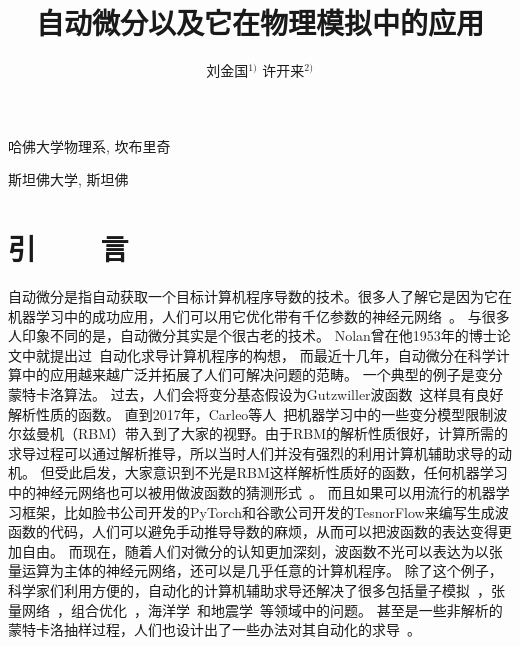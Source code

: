 \documentclass[A4,twoside,fontset=ubuntu,UTF8]{ctexart}
\begin{document}
\apsname

\title{自动微分以及它在物理模拟中的应用\fivestar}%

\author{刘金国$^{1)}$ \quad 许开来$^{2)}$}

\address{1)}{哈佛大学物理系, 坎布里奇 }
\address{2)}{斯坦佛大学, 斯坦佛 }





\cfund{}




{}\baselineskip
\section{引~~~~言}
    自动微分是指自动获取一个目标计算机程序导数的技术。很多人了解它是因为它在机器学习中的成功应用，人们可以用它优化带有千亿参数的神经元网络~\cite{Rosset2019}。
与很多人印象不同的是，自动微分其实是个很古老的技术。
Nolan曾在他1953年的博士论文中就提出过~\cite{Nolan1953}自动化求导计算机程序的构想，
而最近十几年，自动微分在科学计算中的应用越来越广泛并拓展了人们可解决问题的范畴。
    一个典型的例子是变分蒙特卡洛算法。
过去，人们会将变分基态假设为Gutzwiller波函数~\cite{Gutzwiller1963}这样具有良好解析性质的函数。
直到2017年，Carleo等人~\cite{Carleo2017, Deng2017}把机器学习中的一些变分模型限制波尔兹曼机（RBM）带入到了大家的视野。由于RBM的解析性质很好，计算所需的求导过程可以通过解析推导，所以当时人们并没有强烈的利用计算机辅助求导的动机。
但受此启发，大家意识到不光是RBM这样解析性质好的函数，任何机器学习中的神经元网络也可以被用做波函数的猜测形式~\cite{Cai2018}。
而且如果可以用流行的机器学习框架，比如脸书公司开发的PyTorch和谷歌公司开发的TesnorFlow来编写生成波函数的代码，人们可以避免手动推导导数的麻烦，从而可以把波函数的表达变得更加自由。
而现在，随着人们对微分的认知更加深刻，波函数不光可以表达为以张量运算为主体的神经元网络，还可以是几乎任意的计算机程序。
    除了这个例子，科学家们利用方便的，自动化的计算机辅助求导还解决了很多包括量子模拟~\cite{Luo2019}，张量网络~\cite{Liao2019}，组合优化~\cite{Liu2020}，海洋学~\cite{Heimbach2005}和地震学~\cite{Symes2007,Zhu2020}等领域中的问题。
甚至是一些非解析的蒙特卡洛抽样过程，人们也设计出了一些办法对其自动化的求导~\cite{Zhang2019}。
\end{document}
